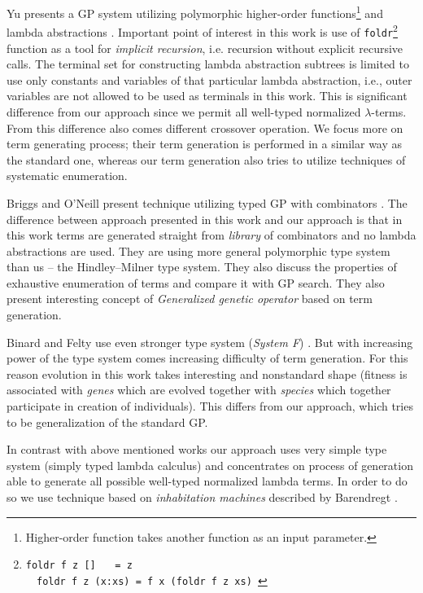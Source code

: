 \documentclass[conference]{IEEEtran}
\newcommand{\lterms}{$\lambda$-terms\xspace}
\begin{document}
Yu presents a GP system utilizing
polymorphic higher-order functions\footnote{Higher-order 
function takes another function as an input parameter.
} and lambda abstractions  \cite{yu01}.
Important point of interest in this work is use of \texttt{foldr}\footnote{ \texttt{foldr f z [] $~~~$  = z\\ 
$~~~\;$foldr f z (x:xs) = f x (foldr f z xs) }} function as a tool for \textit{implicit recursion},
i.e. recursion without explicit recursive calls. 
The terminal set for constructing lambda abstraction subtrees 
is limited to use only constants and variables of that particular
lambda abstraction, i.e., outer variables are not allowed to be used
as terminals in this work. This is significant difference from our approach 
since we permit all well-typed normalized \lterms. From this difference also
comes different crossover operation. We focus more on term generating process; 
their term generation is performed in a similar way as the standard one, 
whereas our term generation also tries to utilize techniques of systematic enumeration. 

Briggs and O’Neill present technique 
utilizing typed GP with combinators \cite{kes}.
The difference between approach presented in this work
and our approach is that in this work terms are generated
straight from \textit{library} of combinators and no lambda abstractions
are used. They are using more general polymorphic type system than us
-- the Hindley–Milner type system. They also discuss the 
properties of exhaustive enumeration of terms and compare it with GP search.  
They also present interesting concept of \textit{Generalized
genetic operator} based on term generation. 

Binard and Felty use even 
stronger type system (\textit{System F}) \cite{binard2008genetic}.  
But with increasing power of the type system comes increasing difficulty of term generation.
For this reason evolution in this work takes interesting and nonstandard shape 
(fitness is associated with \textit{genes} which are evolved together with \textit{species}
which together participate in creation of individuals).
This differs from our approach, which tries to be generalization of
the standard GP\cite{koza92}.

In contrast with above mentioned works our approach uses very simple type system 
(simply typed lambda calculus) and concentrates on process of generation  
able to generate all possible well-typed normalized lambda terms. In order to do
so we use technique based on \textit{inhabitation machines} 
described by Barendregt \cite{barendregt10}.    
\end{document}
